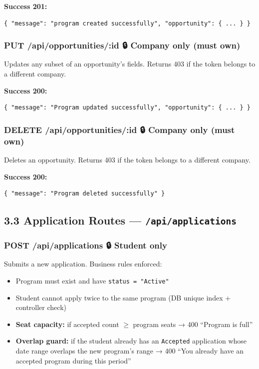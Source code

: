 \documentclass[12pt,a4paper]{article}
\begin{document}
\textbf{Success 201:}
\begin{lstlisting}[language={}]
{ "message": "program created successfully", "opportunity": { ... } }
\end{lstlisting}

\vspace{0.5cm}

\subsubsection*{PUT /api/opportunities/:id \quad 🔒 Company only (must own)}

Updates any subset of an opportunity's fields. Returns 403 if the token belongs to a different company.

\textbf{Success 200:}
\begin{lstlisting}[language={}]
{ "message": "Program updated successfully", "opportunity": { ... } }
\end{lstlisting}

\vspace{0.5cm}

\subsubsection*{DELETE /api/opportunities/:id \quad 🔒 Company only (must own)}

Deletes an opportunity. Returns 403 if the token belongs to a different company.

\textbf{Success 200:}
\begin{lstlisting}[language={}]
{ "message": "Program deleted successfully" }
\end{lstlisting}

\vspace{0.5cm}

\subsection*{3.3 Application Routes — \texttt{/api/applications}}

\subsubsection*{POST /api/applications \quad 🔒 Student only}

Submits a new application. Business rules enforced:
\begin{itemize}[leftmargin=1.5cm]
  \item Program must exist and have \texttt{status = "Active"}
  \item Student cannot apply twice to the same program (DB unique index + controller check)
  \item \textbf{Seat capacity:} if accepted count $\geq$ program seats → 400 ``Program is full''
  \item \textbf{Overlap guard:} if the student already has an \texttt{Accepted} application whose date range overlaps the new program's range → 400 ``You already have an accepted program during this period''
\end{itemize}
\end{document}
